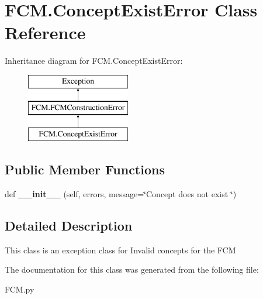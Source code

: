 \hypertarget{class_f_c_m_1_1_concept_exist_error}{}\section{F\+C\+M.\+Concept\+Exist\+Error Class Reference}
\label{class_f_c_m_1_1_concept_exist_error}
Inheritance diagram for F\+C\+M.\+Concept\+Exist\+Error\+:\begin{figure}[H]
\begin{center}
\leavevmode
\includegraphics[height=3.000000cm]{class_f_c_m_1_1_concept_exist_error}
\end{center}
\end{figure}
\subsection*{Public Member Functions}
\begin{DoxyCompactItemize}
\item 
\hypertarget{class_f_c_m_1_1_concept_exist_error_ae367be09252d2594b59a659afac8a6da}{}\label{class_f_c_m_1_1_concept_exist_error_ae367be09252d2594b59a659afac8a6da} 
def {\bfseries \+\_\+\+\_\+init\+\_\+\+\_\+} (self, errors, message=\char`\"{}Concept does not exist \char`\"{})
\end{DoxyCompactItemize}


\subsection{Detailed Description}
\begin{DoxyVerb}This class is an exception class for Invalid concepts for the FCM
\end{DoxyVerb}
 

The documentation for this class was generated from the following file\+:\begin{DoxyCompactItemize}
\item 
F\+C\+M.\+py\end{DoxyCompactItemize}
